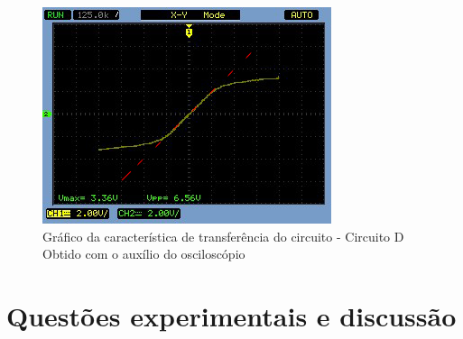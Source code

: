 \documentclass[10pt, final, a4paper]{IEEEtran} %
\begin{document}
\begin{figure}[ht!]
	\captionsetup{justification=centering}
	\centering
	\includegraphics[width=0.8\linewidth]{imagens/circuitos_resp/d02.jpg}
	\caption{Gráfico da característica de transferência do circuito - Circuito D\\ Obtido com o auxílio do osciloscópio}
	\label{d02}
\end{figure}
\FloatBarrier

\section{Questões experimentais e discussão}
\vspace{0.5cm}
\end{document}
